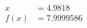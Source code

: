 \documentclass[preview]{standalone}
\begin{document}
\begin{align*}
x &= 4.9818\\f(x) &= 7.9999586
\end{align*}
\end{document}
